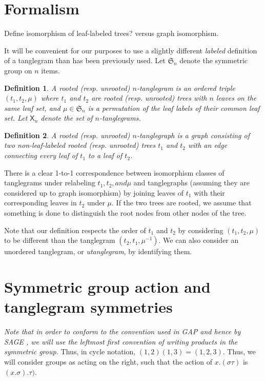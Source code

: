\documentclass{amsart}
\newtheorem{definition}{Definition}
\newcommand{\fS}{\mathfrak S}
\newcommand{\pairing}{\mu}
\newcommand{\tangle}{\mathsf{X}}
\begin{document}
\section{Formalism}
Define isomorphism of leaf-labeled trees?
versus graph isomorphism.

It will be convenient for our purposes to use a slightly different \emph{labeled} definition of a tanglegram than has been previously used.
Let $\fS_n$ denote the symmetric group on $n$ items.
\begin{definition}
\label{def:tanglegram}
A rooted (resp. unrooted) $n$-\emph{tanglegram} is an ordered triple $(t_1, t_2, \pairing)$ where $t_1$ and $t_2$ are rooted (resp. unrooted) trees with $n$ leaves on the same leaf set, and $\pairing \in \fS_n$ is a permutation of the leaf labels of their common leaf set.
Let $\tangle_n$ denote the set of $n$-tanglegrams.
\end{definition}
\begin{definition}
\label{def:tanglegraph}
A rooted (resp. unrooted) $n$-\emph{tanglegraph} is a graph consisting of two non-leaf-labeled rooted (resp. unrooted) trees $t_1$ and $t_2$ with an edge connecting every leaf of $t_1$ to a leaf of $t_2$.
\end{definition}
There is a clear 1-to-1 correspondence between isomorphism classes of tanglegrams under relabeling $t_1, t_2, and \pairing$ and tanglegraphs (assuming they are considered up to graph isomorphism) by joining leaves of $t_1$ with their corresponding leaves in $t_2$ under $\pairing$.
If the two trees are rooted, we assume that something is done to distinguish the root nodes from other nodes of the tree.

Note that our definition respects the order of $t_1$ and $t_2$ by considering $(t_1, t_2, \pairing)$ to be different than the tanglegram $(t_2, t_1, \pairing^{-1})$.
We can also consider an unordered tanglegram, or \emph{utanglegram}, by identifying them.


\section{Symmetric group action and tanglegram symmetries}
\emph{Note that in order to conform to the convention used in GAP \cite{GAP4} and hence by SAGE \cite{SteinJoyner2005}, we will use the leftmost first convention of writing products in the symmetric group.}
Thus, in cycle notation, $(1,2) (1,3) = (1,2,3)$.
Thus, we will consider groups as acting on the right, such that the action of $x.(\sigma \tau)$ is $(x.\sigma) . \tau)$.
\end{document}
